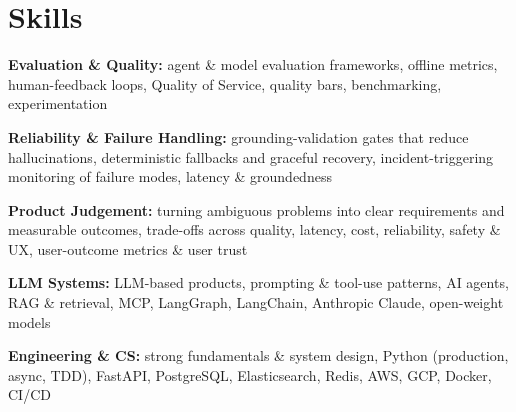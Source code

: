 \documentclass[10pt,a4paper]{article}
\begin{document}
\section{Skills}
\begin{tight}
  \item[\textcolor{accent}{\small$\bullet$}] \textbf{Evaluation \& Quality:} agent \& model evaluation frameworks, offline metrics, human-feedback loops, Quality of Service, quality bars, benchmarking, experimentation
  \item[\textcolor{accent}{\small$\bullet$}] \textbf{Reliability \& Failure Handling:} grounding-validation gates that reduce hallucinations, deterministic fallbacks and graceful recovery, incident-triggering monitoring of failure modes, latency \& groundedness
  \item[\textcolor{accent}{\small$\bullet$}] \textbf{Product Judgement:} turning ambiguous problems into clear requirements and measurable outcomes, trade-offs across quality, latency, cost, reliability, safety \& UX, user-outcome metrics \& user trust
  \item[\textcolor{accent}{\small$\bullet$}] \textbf{LLM Systems:} LLM-based products, prompting \& tool-use patterns, AI agents, RAG \& retrieval, MCP, LangGraph, LangChain, Anthropic Claude, open-weight models
  \item[\textcolor{accent}{\small$\bullet$}] \textbf{Engineering \& CS:} strong fundamentals \& system design, Python (production, async, TDD), FastAPI, PostgreSQL, Elasticsearch, Redis, AWS, GCP, Docker, CI/CD
\end{tight}

\end{document}
